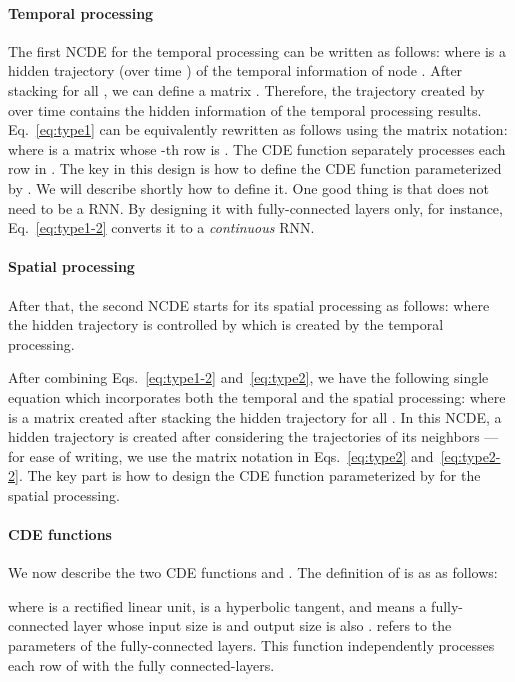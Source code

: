 \documentclass[letterpaper]{article} \usepackage{aaai22}  \usepackage{times}  \usepackage{helvet}  \usepackage{courier}  \usepackage[hyphens]{url}  \usepackage{graphicx} \urlstyle{rm} \def\UrlFont{\rm}  \usepackage{natbib}  \usepackage{caption} \DeclareCaptionStyle{ruled}{labelfont=normalfont,labelsep=colon,strut=off} \frenchspacing  \setlength{\pdfpagewidth}{8.5in}  \setlength{\pdfpageheight}{11in}  \usepackage{stfloats}
\begin{document}
\paragraph{Temporal processing} The first NCDE for the temporal processing can be written as follows:
 where  is a hidden trajectory (over time ) of the temporal information of node . After stacking  for all , we can define a matrix . Therefore, the trajectory created by  over time  contains the hidden information of the temporal processing results. Eq.~\eqref{eq:type1} can be equivalently rewritten as follows using the matrix notation:
where  is a matrix whose -th row is . The CDE function  separately processes each row in . The key in this design is how to define the CDE function  parameterized by . We will describe shortly how to define it. One good thing is that  does not need to be a RNN. By designing it with fully-connected layers only, for instance, Eq.~\eqref{eq:type1-2} converts it to a \emph{continuous} RNN. 

\paragraph{Spatial processing} After that, the second NCDE starts for its spatial processing as follows:
where the hidden trajectory  is controlled by  which is created by the temporal processing.

After combining Eqs.~\eqref{eq:type1-2} and~\eqref{eq:type2}, we have the following single equation which incorporates both the temporal and the spatial processing:
where  is a matrix created after stacking the hidden trajectory  for all . In this NCDE, a hidden trajectory  is created after considering the trajectories of its neighbors --- for ease of writing, we use the matrix notation in Eqs.~\eqref{eq:type2} and~\eqref{eq:type2-2}. The key part is how to design the CDE function  parameterized by  for the spatial processing.

\paragraph{CDE functions} We now describe the two CDE functions  and . The definition of  is as as follows:

where  is a rectified linear unit,  is a hyperbolic tangent, and  means a fully-connected layer whose input size is  and output size is also .  refers to the parameters of the fully-connected layers. This function  independently processes each row of  with the  fully connected-layers.
\end{document}
